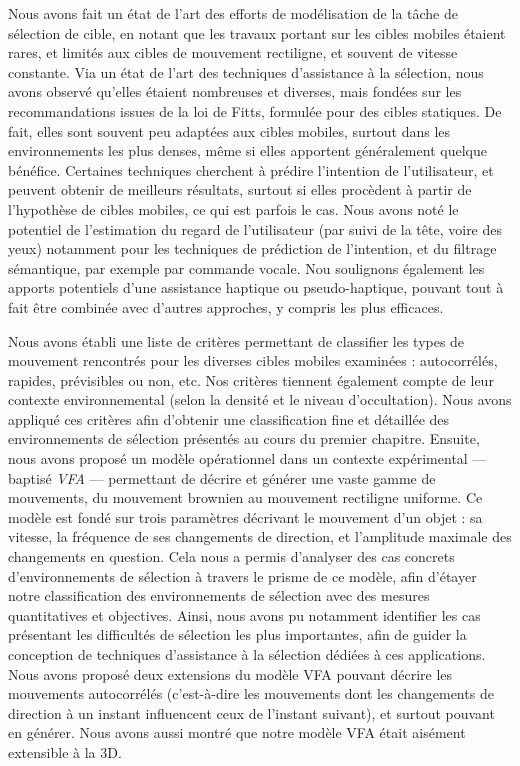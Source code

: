 	Nous avons fait un état de l'art des efforts de modélisation de la tâche de sélection de cible, en notant que les travaux portant sur les cibles mobiles étaient rares, et limités aux cibles de mouvement rectiligne, et souvent de vitesse constante. Via un état de l'art des techniques d'assistance à la sélection, nous avons observé qu'elles étaient nombreuses et diverses, mais fondées sur les recommandations issues de la loi de Fitts, formulée pour des cibles statiques. De fait, elles sont souvent peu adaptées aux cibles mobiles, surtout dans les environnements les plus denses, même si elles apportent généralement quelque bénéfice. Certaines techniques cherchent à prédire l'intention de l'utilisateur, et peuvent obtenir de meilleurs résultats, surtout si elles procèdent à partir de l'hypothèse de cibles mobiles, ce qui est parfois le cas. Nous avons noté le potentiel de l'estimation du regard de l'utilisateur (par suivi de la tête, voire des yeux) notamment pour les techniques de prédiction de l'intention, et du filtrage sémantique, par exemple par commande vocale. Nou soulignons également les apports potentiels d'une assistance haptique ou pseudo-haptique, pouvant tout à fait être combinée avec d'autres approches, y compris les plus efficaces.
	
	Nous avons établi une liste de critères permettant de classifier les types de mouvement rencontrés pour les diverses cibles mobiles examinées : autocorrélés, rapides, prévisibles ou non, etc. Nos critères tiennent également compte de leur contexte environnemental (selon la densité et le niveau d'occultation). Nous avons appliqué ces critères afin d'obtenir une classification fine et détaillée des environnements de sélection présentés au cours du premier chapitre. Ensuite, nous avons proposé un modèle opérationnel dans un contexte expérimental --- baptisé \emph{VFA} --- permettant de décrire et générer une vaste gamme de mouvements, du mouvement brownien au mouvement rectiligne uniforme. Ce modèle est fondé sur trois paramètres décrivant le mouvement d'un objet : sa vitesse, la fréquence de ses changements de direction, et l'amplitude maximale des changements en question. Cela nous a permis d'analyser des cas concrets d'environnements de sélection à travers le prisme de ce modèle, afin d'étayer notre classification des environnements de sélection avec des mesures quantitatives et objectives. Ainsi, nous avons pu notamment identifier les cas présentant les difficultés de sélection les plus importantes, afin de guider la conception de techniques d'assistance à la sélection dédiées à ces applications. Nous avons proposé deux extensions du modèle VFA pouvant décrire les mouvements autocorrélés (c'est-à-dire les mouvements dont les changements de direction à un instant influencent ceux de l'instant suivant), et surtout pouvant en générer. Nous avons aussi montré que notre modèle VFA était aisément extensible à la 3D.
	
